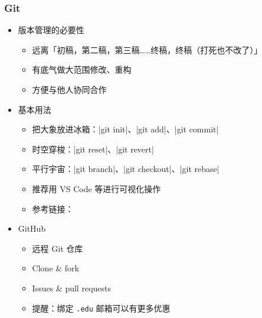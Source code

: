 \begin{frame}[fragile]
\frametitle{Git}
\begin{itemize}
  \item<+-> 版本管理的必要性

    \begin{itemize}
      \item 远离「初稿，第二稿，第三稿……终稿，终稿（打死也不改了）」
      \item 有底气做大范围修改、重构
      \item 方便与他人协同合作
    \end{itemize}

  \item<+-> 基本用法

    \begin{itemize}
      \item 把大象放进冰箱：|git init|、|git add|、|git commit|
      \item 时空穿梭：|git reset|、|git revert|
      \item 平行宇宙：|git branch|、|git checkout|、|git rebase|
      \item 推荐用 VS Code 等进行可视化操作
      \item 参考链接：
    \end{itemize}

  \item<+-> GitHub \href{https://github.com}{\faGithub}

    \begin{itemize}
      \item 远程 Git 仓库
      \item Clone \& fork
      \item Issues \& pull requests
      \item<+-> \alert{提醒：绑定 \texttt{.edu} 邮箱可以有更多优惠}
    \end{itemize}
\end{itemize}
\end{frame}


